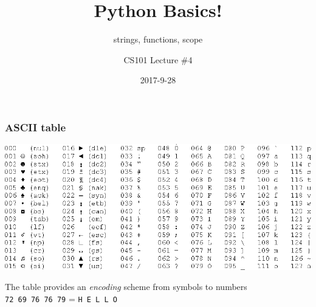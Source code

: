 \documentclass[11pt]{beamer}
\title{Python Basics!}
\subtitle{strings, functions, scope}
\author{CS101 Lecture \#4}
\date{2017-9-28}
\begin{document}
  \setcounter{showProgressBar}{0}
  \setcounter{showSlideNumbers}{0}

\frame{\titlepage}

\setcounter{framenumber}{0}
\setcounter{showProgressBar}{1}
\setcounter{showSlideNumbers}{1}

\begin{frame}
  \frametitle{ASCII table}
  \Enlarge
  \includegraphics[width=\textwidth]{./img/ascii-table.png} \\ \pause
  
  {\small The table provides an \emph{encoding} scheme from symbols to numbers} \\
  \texttt{72 69 76 76 79} = \texttt{H E L L O} %
  
\end{frame}
\end{document}
